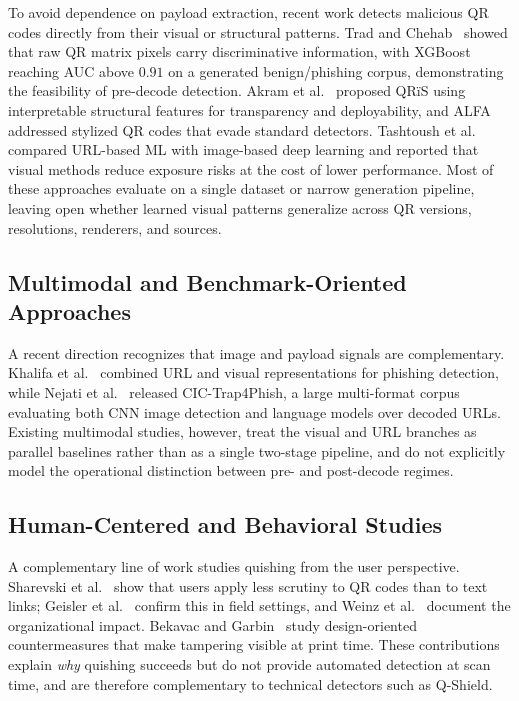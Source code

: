 \documentclass[conference]{IEEEtran}
\begin{document}
To avoid dependence on payload extraction, recent work detects malicious QR codes directly from their visual or structural patterns. Trad and Chehab~\cite{trad2025detecting} showed that raw QR matrix pixels carry discriminative information, with XGBoost reaching AUC above $0.91$ on a generated benign/phishing corpus, demonstrating the feasibility of pre-decode detection. Akram et al.~\cite{akram2025qr} proposed QR\"iS using interpretable structural features for transparency and deployability, and ALFA~\cite{wahid2026alfa} addressed stylized QR codes that evade standard detectors. Tashtoush et al.~\cite{tashtoush2025comparing} compared URL-based ML with image-based deep learning and reported that visual methods reduce exposure risks at the cost of lower performance. Most of these approaches evaluate on a single dataset or narrow generation pipeline, leaving open whether learned visual patterns generalize across QR versions, resolutions, renderers, and sources.

\subsection{Multimodal and Benchmark-Oriented Approaches}

A recent direction recognizes that image and payload signals are complementary. Khalifa et al.~\cite{khalifa2025multiphishnet} combined URL and visual representations for phishing detection, while Nejati et al.~\cite{nejati2026cic} released CIC-Trap4Phish, a large multi-format corpus evaluating both CNN image detection and language models over decoded URLs. Existing multimodal studies, however, treat the visual and URL branches as parallel baselines rather than as a single two-stage pipeline, and do not explicitly model the operational distinction between pre- and post-decode regimes.

\subsection{Human-Centered and Behavioral Studies}

A complementary line of work studies quishing from the user perspective. Sharevski et al.~\cite{sharevski2022phishing} show that users apply less scrutiny to QR codes than to text links; Geisler et al.~\cite{geisler2024hooked} confirm this in field settings, and Weinz et al.~\cite{weinz2025impact} document the organizational impact. Bekavac and Garbin~\cite{bekavac2024qr} study design-oriented countermeasures that make tampering visible at print time. These contributions explain \emph{why} quishing succeeds but do not provide automated detection at scan time, and are therefore complementary to technical detectors such as Q-Shield.
\end{document}
